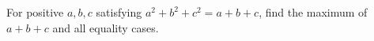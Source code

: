 For positive $a,b,c$ satisfying $a^2+b^2+c^2=a+b+c$, find the maximum of $a+b+c$ and all equality cases.
